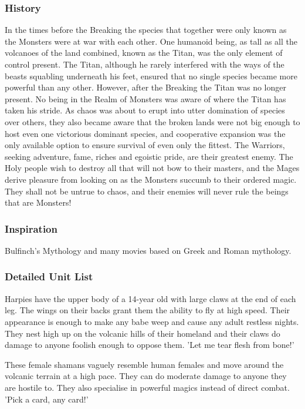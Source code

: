 \documentclass[a4paper,twocolumn]{article}
\begin{document}
\subsubsection{History}

In the times before the Breaking the species that together were only known as the Monsters were at war with each other. One humanoid being, as tall as all the volcanoes of the land combined, known as the Titan, was the only element of control present. The Titan, although he rarely interfered with the ways of the beasts squabling underneath his feet, ensured that no single species became more powerful than any other. However, after the Breaking the Titan was no longer present. No being in the Realm of Monsters was aware of where the Titan has taken his stride. As chaos was about to erupt into utter domination of species over others, they also became aware that the broken lands were not big enough to host even one victorious dominant species, and cooperative expansion was the only available option to ensure survival of even only the fittest. The Warriors, seeking adventure, fame, riches and egoistic pride, are their greatest enemy. The Holy people wish to destroy all that will not bow to their masters, and the Mages derive pleasure from looking on as the Monsters succumb to their ordered magic. They shall not be untrue to chaos, and their enemies will never rule the beings that are Monsters!

\subsubsection{Inspiration}

Bulfinch's Mythology and many movies based on Greek and Roman mythology.

\subsubsection{Detailed Unit List}

Harpies have the upper body of a 14-year old with large claws at the end of each leg. The wings on their backs grant them the ability to fly at high speed. Their appearance is enough to make any babe weep and cause any adult restless nights. They nest high up on the volcanic hills of their homeland and their claws do damage to anyone foolish enough to oppose them. 'Let me tear flesh from bone!'

These female shamans vaguely resemble human females and move around the volcanic terrain at a high pace. They can do moderate damage to anyone they are hostile to. They also specialise in powerful magics instead of direct combat. 'Pick a card, any card!'
\end{document}
